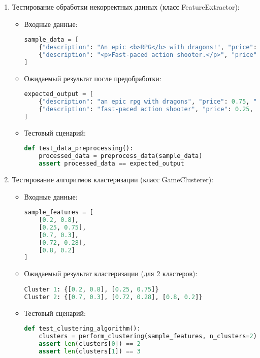 \documentclass{article}
\begin{document}
\begin{enumerate}[label=\arabic*.]
    \item Тестирование обработки некорректных данных (класс FeatureExtractor):
    \begin{itemize}
        \item Входные данные:
        \begin{lstlisting}[language=Python]
sample_data = [
    {"description": "An epic <b>RPG</b> with dragons!", "price": 59.99, "metacritic": 85, "median_forever": 120},
    {"description": "<p>Fast-paced action shooter.</p>", "price": 19.99, "metacritic": 70, "median_forever": 50}
]
        \end{lstlisting}
        \item Ожидаемый результат после предобработки:
        \begin{lstlisting}[language=Python]
expected_output = [
    {"description": "an epic rpg with dragons", "price": 0.75, "metacritic": 0.85, "median_forever": 0.6},
    {"description": "fast-paced action shooter", "price": 0.25, "metacritic": 0.7, "median_forever": 0.25}
]
        \end{lstlisting}
        \item Тестовый сценарий:
        \begin{lstlisting}[language=Python]
def test_data_preprocessing():
    processed_data = preprocess_data(sample_data)
    assert processed_data == expected_output
        \end{lstlisting}
    \end{itemize}

    \item Тестирование алгоритмов кластеризации (класс GameClusterer):
    \begin{itemize}
        \item Входные данные:
        \begin{lstlisting}[language=Python]
sample_features = [
    [0.2, 0.8],
    [0.25, 0.75],
    [0.7, 0.3],
    [0.72, 0.28],
    [0.8, 0.2]
]
        \end{lstlisting}
        \item Ожидаемый результат кластеризации (для 2 кластеров):
        \begin{lstlisting}[language=Python]
Cluster 1: {[0.2, 0.8], [0.25, 0.75]}
Cluster 2: {[0.7, 0.3], [0.72, 0.28], [0.8, 0.2]}
        \end{lstlisting}
        \item Тестовый сценарий:
        \begin{lstlisting}[language=Python]
def test_clustering_algorithm():
    clusters = perform_clustering(sample_features, n_clusters=2)
    assert len(clusters[0]) == 2
    assert len(clusters[1]) == 3
        \end{lstlisting}
    \end{itemize}


\end{enumerate}
\end{document}
